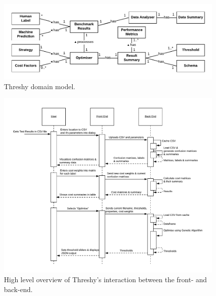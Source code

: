 \begin{figure}[p!]
\centering
\caption[Threshy domain model]{Threshy domain model.}
\label{fig:additional:threshy-domain-model}
\includegraphics[width=\linewidth]{appendix/figures/threshy-domain-model}
\end{figure}

\begin{figure}[p!]
\centering
\caption[Threshy sequence diagram]{High level overview of Threshy's interaction between the front- and back-end.}
\label{fig:additional:threshy-sequence-diagram}
\includegraphics[width=\linewidth]{appendix/figures/threshy-sequence-diagram}
\end{figure}



